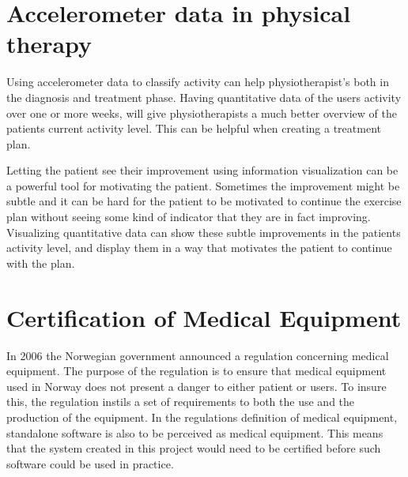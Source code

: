 \section{Accelerometer data in physical therapy}
Using accelerometer data to classify activity can help physiotherapist's both in the diagnosis and treatment phase. Having quantitative data of the users activity over one or more weeks, will give physiotherapists a much better overview of the patients current activity level. This can be helpful when creating a treatment plan.

Letting the patient see their improvement using information visualization can be a powerful tool for motivating the patient. Sometimes the improvement might be subtle and it can be hard for the patient to be motivated to continue the exercise plan without seeing some kind of indicator that they are in fact improving. Visualizing quantitative data can show these subtle improvements in the patients activity level, and display them in a way that motivates the patient to continue with the plan.  

\section{Certification of Medical Equipment}
In 2006 the Norwegian government announced a regulation concerning medical equipment. The purpose of the regulation is to ensure that medical equipment used in Norway does not present a danger to either patient or users. To insure this, the regulation instils a set of requirements to both the use and the production of the equipment. In the regulations definition of medical equipment, standalone software is also to be perceived as medical equipment. This means that the system created in this project would need to be certified before such software could be used in practice. 

